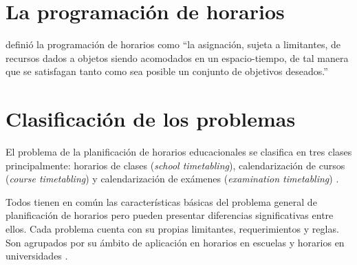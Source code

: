 \documentclass[draft,12pt,headsepline,footsepline,paper=letter]{scrreprt}
\begin{document}
\section{La programación de horarios}
\label{sec:programacion_horarios}

\citet[p.~53]{wren95scheduling-timetabling} definió la programación de horarios como “la asignación, sujeta a limitantes, de recursos dados a objetos siendo acomodados en un espacio-tiempo, de tal manera que se satisfagan tanto como sea posible un conjunto de objetivos deseados.”

\section{Clasificación de los problemas}

El problema de la planificación de horarios educacionales se clasifica en tres clases principalmente:
horarios de clases (\textit{school timetabling}),
calendarización de cursos (\textit{course timetabling}) y
calendarización de exámenes (\textit{examination timetabling}) \citep[p.~88]{schaerf99a-survey-of-automated}.

Todos tienen en común las características básicas del problema general de planificación de horarios pero pueden presentar diferencias significativas entre ellos. Cada problema cuenta con su propias limitantes, requerimientos y reglas. Son agrupados por su ámbito de aplicación en horarios en escuelas y horarios en universidades \citep[p.~10]{abdullah06heuristic-approaches}.
\end{document}
